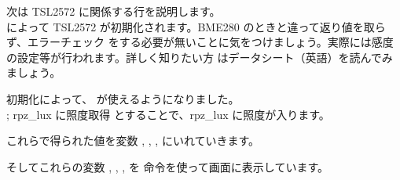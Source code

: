 次は TSL2572 に関係する行を説明します。\\
によって TSL2572 が初期化されます。BME280 のときと違って返り値を取らず、エラーチェック
をする必要が無いことに気をつけましょう。実際には感度の設定等が行われます。詳しく知りたい方
はデータシート（英語）を読んでみましょう。

初期化によって、 が使えるようになりました。 \\
 ; rpz\_lux に照度取得
とすることで、rpz\_lux に照度が入ります。

これらで得られた値を変数 , , ,  にいれていきます。\\

そしてこれらの変数 , , ,  を  命令を使って画面に表示しています。\\

\begin{tcolorbox}[title=\useOmetoi]
\begin{enumerate}
\end{enumerate}
\end{tcolorbox}

